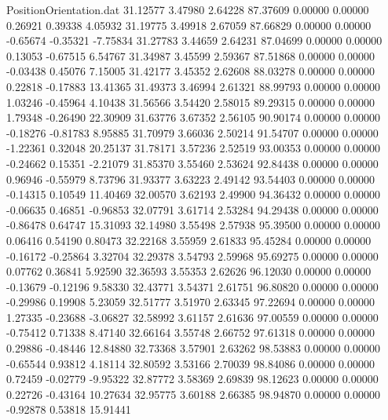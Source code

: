 \begin{filecontents}{PositionOrientation.dat}
  31.12577    3.47980    2.64228    87.37609    0.00000    0.00000    0.26921    0.39338    4.05932
  31.19775    3.49918    2.67059    87.66829    0.00000    0.00000   -0.65674   -0.35321   -7.75834
  31.27783    3.44659    2.64231    87.04699    0.00000    0.00000    0.13053   -0.67515    6.54767
  31.34987    3.45599    2.59367    87.51868    0.00000    0.00000   -0.03438    0.45076    7.15005
  31.42177    3.45352    2.62608    88.03278    0.00000    0.00000    0.22818   -0.17883   13.41365
  31.49373    3.46994    2.61321    88.99793    0.00000    0.00000    1.03246   -0.45964    4.10438
  31.56566    3.54420    2.58015    89.29315    0.00000    0.00000    1.79348   -0.26490   22.30909
  31.63776    3.67352    2.56105    90.90174    0.00000    0.00000   -0.18276   -0.81783    8.95885
  31.70979    3.66036    2.50214    91.54707    0.00000    0.00000   -1.22361    0.32048   20.25137
  31.78171    3.57236    2.52519    93.00353    0.00000    0.00000   -0.24662    0.15351   -2.21079
  31.85370    3.55460    2.53624    92.84438    0.00000    0.00000    0.96946   -0.55979    8.73796
  31.93377    3.63223    2.49142    93.54403    0.00000    0.00000   -0.14315    0.10549   11.40469
  32.00570    3.62193    2.49900    94.36432    0.00000    0.00000   -0.06635    0.46851   -0.96853
  32.07791    3.61714    2.53284    94.29438    0.00000    0.00000   -0.86478    0.64747   15.31093
  32.14980    3.55498    2.57938    95.39500    0.00000    0.00000    0.06416    0.54190    0.80473
  32.22168    3.55959    2.61833    95.45284    0.00000    0.00000   -0.16172   -0.25864    3.32704
  32.29378    3.54793    2.59968    95.69275    0.00000    0.00000    0.07762    0.36841    5.92590
  32.36593    3.55353    2.62626    96.12030    0.00000    0.00000   -0.13679   -0.12196    9.58330
  32.43771    3.54371    2.61751    96.80820    0.00000    0.00000   -0.29986    0.19908    5.23059
  32.51777    3.51970    2.63345    97.22694    0.00000    0.00000    1.27335   -0.23688   -3.06827
  32.58992    3.61157    2.61636    97.00559    0.00000    0.00000   -0.75412    0.71338    8.47140
  32.66164    3.55748    2.66752    97.61318    0.00000    0.00000    0.29886   -0.48446   12.84880
  32.73368    3.57901    2.63262    98.53883    0.00000    0.00000   -0.65544    0.93812    4.18114
  32.80592    3.53166    2.70039    98.84086    0.00000    0.00000    0.72459   -0.02779   -9.95322
  32.87772    3.58369    2.69839    98.12623    0.00000    0.00000    0.22726   -0.43164   10.27634
  32.95775    3.60188    2.66385    98.94870    0.00000    0.00000   -0.92878    0.53818   15.91441

\end{filecontents}
